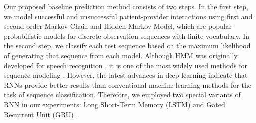 \documentclass{amia_summit_2018}
\begin{document}
Our proposed baseline prediction method consists of two steps. In the first step, we model successful and unsuccessful patient-provider interactions using first and second-order Markov Chain and
Hidden Markov Model, which are popular probabilistic models for discrete observation sequences with finite vocabulary. In the second step, we classify each test sequence based on the maximum
likelihood of generating that sequence from each model. Although HMM was originally developed for speech recognition \cite{rabiner1989tutorial}, it is one of the most widely used methods for sequence
modeling \cite{mutsam2016maximum, won2004training}. However, the latest advances in deep learning indicate that RNNs provide better results than conventional machine learning methods for the task of
sequence classification. Therefore, we employed two special variants of RNN in our experiments: Long Short-Term Memory (LSTM) \cite{hochreiter1997long} and Gated Recurrent Unit (GRU)
\cite{chung2014empirical}.
\end{document}
